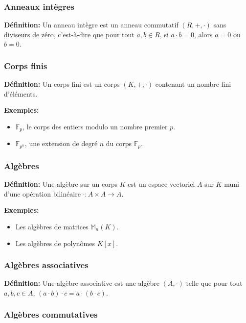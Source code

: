 \subsubsection{Anneaux intègres}

\textbf{Définition:}
Un anneau intègre est un anneau commutatif $(R, +, \cdot)$ sans diviseurs de zéro, c'est-à-dire que pour tout $a, b \in R$, si $a \cdot b = 0$, alors $a = 0$ ou $b = 0$.

\subsubsection{Corps finis}

\textbf{Définition:}
Un corps fini est un corps $(K, +, \cdot)$ contenant un nombre fini d'éléments.

\textbf{Exemples:}
\begin{itemize}
    \item $\mathbb{F}_p$, le corps des entiers modulo un nombre premier $p$.
    \item $\mathbb{F}_{p^n}$, une extension de degré $n$ du corps $\mathbb{F}_p$.
\end{itemize}

\subsubsection{Algèbres}

\textbf{Définition:}
Une algèbre sur un corps $K$ est un espace vectoriel $A$ sur $K$ muni d'une opération bilinéaire $\cdot : A \times A \to A$.

\textbf{Exemples:}
\begin{itemize}
    \item Les algèbres de matrices $\mathbb{M}_n(K)$.
    \item Les algèbres de polynômes $K[x]$.
\end{itemize}

\subsubsection{Algèbres associatives}

\textbf{Définition:}
Une algèbre associative est une algèbre $(A, \cdot)$ telle que pour tout $a, b, c \in A$, $(a \cdot b) \cdot c = a \cdot (b \cdot c)$.

\subsubsection{Algèbres commutatives}

